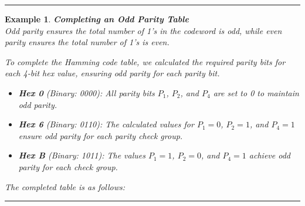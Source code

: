 \documentclass[12pt]{article}
\newtheorem{example}{Example}
\newenvironment{examp}
{\vspace{0.5cm}
 \hrule
\vspace{0.5cm}
\begin{example}}
{\hrule
\vspace{0.5cm}
\end{example}}
\begin{document}
\begin{examp} \textbf{Completing an Odd Parity Table}\\ Odd parity ensures the
	total number of 1's in the codeword is odd, while even parity ensures the
	total number of 1's is even.

	To complete the Hamming code table, we calculated the required parity bits for
	each 4-bit hex value, ensuring odd parity for each parity bit.

	\begin{itemize} \item \textbf{Hex 0} (Binary: 0000): All parity bits \( P_1
		      \), \( P_2 \), and \( P_4 \) are set to 0 to maintain odd parity. \item
		      \textbf{Hex 6} (Binary: 0110): The calculated values for \( P_1 = 0 \), \(
		      P_2 = 1 \), and \( P_4 = 1 \) ensure odd parity for each parity check group.
		\item \textbf{Hex B} (Binary: 1011): The values \( P_1 = 1 \), \( P_2 = 0 \),
		      and \( P_4 = 1 \) achieve odd parity for each check group. \end{itemize}

	The completed table is as follows:


\end{examp}
\end{document}
